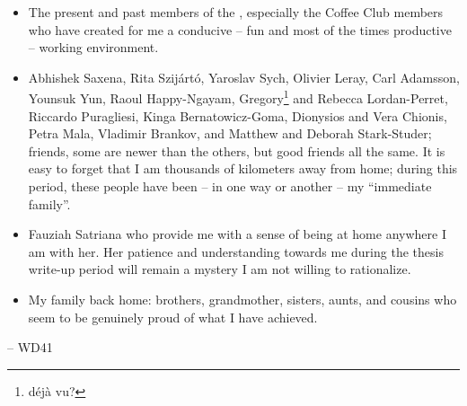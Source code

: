 \begin{itemize}
	\item The present and past members of the , especially the  Coffee Club members who have created for me a conducive -- fun and most of the times productive -- working environment.
	
	\item Abhishek Saxena, Rita Szijártó, Yaroslav Sych, Olivier Leray, Carl Adamsson, Younsuk Yun, Raoul Happy-Ngayam, Gregory\footnote{déjà vu?} and Rebecca Lordan-Perret, Riccardo Puragliesi, Kinga Bernatowicz-Goma, Dionysios and Vera Chionis, Petra Mala, Vladimir Brankov, and Matthew and Deborah Stark-Studer; friends, some are newer than the others, but good friends all the same.
  It is easy to forget that I am thousands of kilometers away from home; during this period, these people have been -- in one way or another -- my ``immediate family''.
  \item Fauziah Satriana who provide me with a sense of being at home anywhere I am with her. Her patience and understanding towards me during the thesis write-up period will remain a mystery I am not willing to rationalize.
  \item My family back home: brothers, grandmother, sisters, aunts, and cousins who seem to be genuinely proud of what I have achieved.
\end{itemize}

\bigskip
\hspace*{0mm}-- WD41
